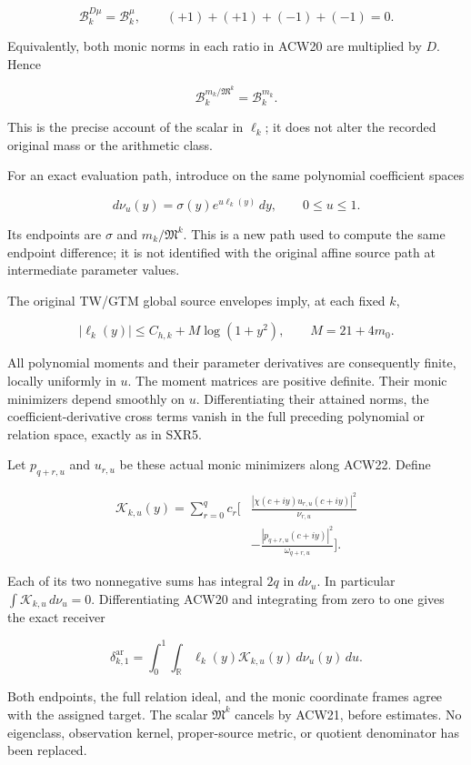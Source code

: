 \[
\mathcal B_k^{D\mu}=\mathcal B_k^\mu,
\qquad (+1)+(+1)+(-1)+(-1)=0.
\]

Equivalently, both monic norms in each ratio in ACW20 are multiplied by \(D\). Hence

\[
\mathcal B_k^{m_k/\mathfrak M^k}=\mathcal B_k^{m_k}.
\tag{ACW21}
\]

This is the precise account of the scalar in \(\ell_k\); it does not alter the recorded original mass or the arithmetic class.

For an exact evaluation path, introduce on the same polynomial coefficient spaces

\[
d\nu_u(y)=\sigma(y)e^{u\ell_k(y)}\,dy,
\qquad0\le u\le1.
\tag{ACW22}
\]

Its endpoints are \(\sigma\) and \(m_k/\mathfrak M^k\). This is a new path used to compute the same endpoint difference; it is not identified with the original affine source path at intermediate parameter values.

The original TW/GTM global source envelopes imply, at each fixed \(k\),

\[
|\ell_k(y)|\le C_{h,k}+M\log(1+y^2),
\qquad M=21+4m_0.
\]

All polynomial moments and their parameter derivatives are consequently finite, locally uniformly in \(u\). The moment matrices are positive definite. Their monic minimizers depend smoothly on \(u\). Differentiating their attained norms, the coefficient-derivative cross terms vanish in the full preceding polynomial or relation space, exactly as in SXR5.

Let \(p_{q+r,u}\) and \(u_{r,u}\) be these actual monic minimizers along ACW22. Define

\[
\begin{aligned}
\mathcal K_{k,u}(y)=\sum_{r=0}^q c_r\bigg[
&\frac{|\chi(c+iy)u_{r,u}(c+iy)|^2}{\nu_{r,u}}\\
&-\frac{|p_{q+r,u}(c+iy)|^2}{\omega_{q+r,u}}
\bigg].
\end{aligned}
\tag{ACW23}
\]

Each of its two nonnegative sums has integral \(2q\) in \(d\nu_u\). In particular \(\int\mathcal K_{k,u}\,d\nu_u=0\). Differentiating ACW20 and integrating from zero to one gives the exact receiver

\[
\boxed{
\delta_{k,1}^{\mathrm{ar}}
=\int_0^1\int_{\mathbb R}
\ell_k(y)\mathcal K_{k,u}(y)\,d\nu_u(y)\,du.}
\tag{ACW24}
\]

Both endpoints, the full relation ideal, and the monic coordinate frames agree with the assigned target. The scalar \(\mathfrak M^k\) cancels by ACW21, before estimates. No eigenclass, observation kernel, proper-source metric, or quotient denominator has been replaced.

